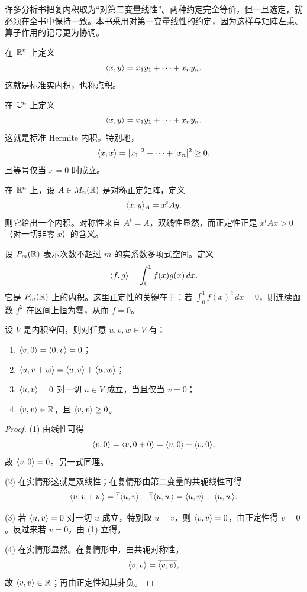 \begin{remark}
许多分析书把复内积取为“对第二变量线性”。两种约定完全等价，但一旦选定，就必须在全书中保持一致。本书采用对第一变量线性的约定，因为这样与矩阵左乘、算子作用的记号更为协调。
\end{remark}

\begin{example}
在 $\mathbb{R}^n$ 上定义
\[
\langle x, y \rangle=x_1y_1+\cdots+x_ny_n.
\]
这就是标准实内积，也称点积。
\end{example}

\begin{example}
在 $\mathbb{C}^n$ 上定义
\[
\langle x, y \rangle=x_1\overline{y_1}+\cdots+x_n\overline{y_n}.
\]
这就是标准 Hermite 内积。特别地，
\[
\langle x, x \rangle=|x_1|^2+\cdots+|x_n|^2\ge 0,
\]
且等号仅当 $x=0$ 时成立。
\end{example}

\begin{example}
在 $\mathbb{R}^n$ 上，设 $A\in M_n(\mathbb{R})$ 是对称正定矩阵，定义
\[
\langle x, y \rangle_A=x^tAy.
\]
则它给出一个内积。对称性来自 $A^t=A$，双线性显然，而正定性正是 $x^tAx>0$（对一切非零 $x$）的含义。
\end{example}

\begin{example}
设 $P_{m}(\mathbb{R})$ 表示次数不超过 $m$ 的实系数多项式空间。定义
\[
\langle f, g \rangle=\int_0^1 f(x)g(x)\,dx.
\]
它是 $P_m(\mathbb{R})$ 上的内积。这里正定性的关键在于：若 $\int_0^1 f(x)^2\,dx=0$，则连续函数 $f^2$ 在区间上恒为零，从而 $f=0$。
\end{example}

\begin{proposition}
设 $V$ 是内积空间，则对任意 $u,v,w\in V$ 有：
\begin{enumerate}[label=\textnormal{(\arabic*)}]
  \item $\langle v, 0 \rangle=\langle 0, v \rangle=0$；
  \item $\langle u, v+w \rangle=\langle u, v \rangle+\langle u, w \rangle$；
  \item $\langle u, v \rangle=0$ 对一切 $u\in V$ 成立，当且仅当 $v=0$；
  \item $\langle v, v \rangle\in\mathbb{R}$，且 $\langle v, v \rangle\ge 0$。
\end{enumerate}
\end{proposition}

\begin{proof}
(1) 由线性可得
\[
\langle v, 0 \rangle=\langle v, 0+0 \rangle=\langle v, 0 \rangle+\langle v, 0 \rangle,
\]
故 $\langle v, 0 \rangle=0$。另一式同理。

(2) 在实情形这就是双线性；在复情形由第二变量的共轭线性可得
\[
\langle u, v+w \rangle=\overline{1}\langle u, v \rangle+\overline{1}\langle u, w \rangle=\langle u, v \rangle+\langle u, w \rangle.
\]

(3) 若 $\langle u, v \rangle=0$ 对一切 $u$ 成立，特别取 $u=v$，则 $\langle v, v \rangle=0$，由正定性得 $v=0$。反过来若 $v=0$，由 (1) 立得。

(4) 在实情形显然。在复情形中，由共轭对称性，
\[
\langle v, v \rangle=\overline{\langle v, v \rangle},
\]
故 $\langle v, v \rangle\in\mathbb{R}$；再由正定性知其非负。
\end{proof}

